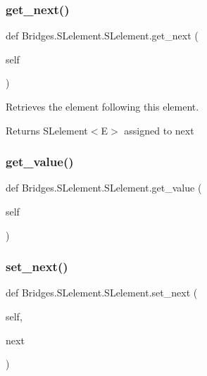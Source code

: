 \subsubsection{\texorpdfstring{get\+\_\+next()}{get\_next()}}
{\footnotesize\ttfamily def Bridges.\+S\+Lelement.\+S\+Lelement.\+get\+\_\+next (\begin{DoxyParamCaption}\item[{}]{self }\end{DoxyParamCaption})}



Retrieves the element following this element. 

\begin{DoxyReturn}{Returns}
S\+Lelement$<$\+E$>$ assigned to next 
\end{DoxyReturn}
\mbox{\label{class_bridges_1_1_s_lelement_1_1_s_lelement_a0b40a1383c849d546f557e126aad5198}} 
\subsubsection{\texorpdfstring{get\+\_\+value()}{get\_value()}}
{\footnotesize\ttfamily def Bridges.\+S\+Lelement.\+S\+Lelement.\+get\+\_\+value (\begin{DoxyParamCaption}\item[{}]{self }\end{DoxyParamCaption})}

\mbox{\label{class_bridges_1_1_s_lelement_1_1_s_lelement_a2f1a7c6a872fda23e3747cdf3b3906d9}} 
\subsubsection{\texorpdfstring{set\+\_\+next()}{set\_next()}}
{\footnotesize\ttfamily def Bridges.\+S\+Lelement.\+S\+Lelement.\+set\+\_\+next (\begin{DoxyParamCaption}\item[{}]{self,  }\item[{}]{next }\end{DoxyParamCaption})}



